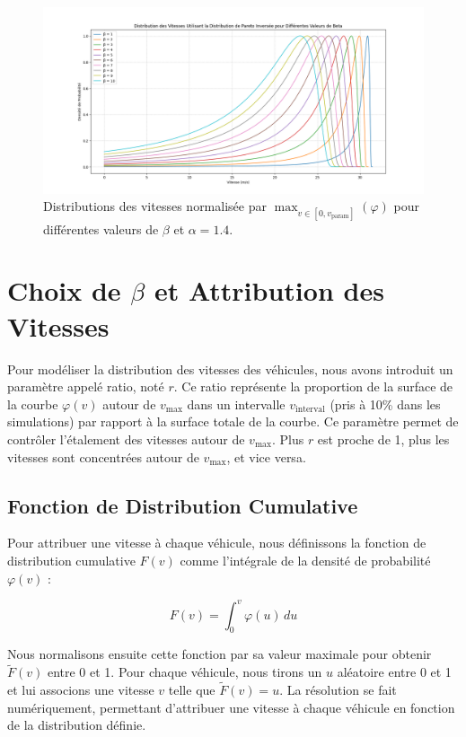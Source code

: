 \documentclass{article}
\begin{document}
\begin{figure}[h!]
    \centering
    \includegraphics[width=\linewidth]{Free Speed Distribution.png}
    \caption{Distributions des vitesses normalisée par \( \displaystyle \max_{v \in [0, v_{\text{param}}]}(\varphi) \) pour différentes valeurs de \(\beta\) et \( \alpha = 1.4 \).}
    \label{fig:pareto_distributions}
\end{figure}



\section{Choix de \(\beta\) et Attribution des Vitesses}

Pour modéliser la distribution des vitesses des véhicules, nous avons introduit un paramètre appelé ratio, noté \(r\). Ce ratio représente la proportion de la surface de la courbe \(\varphi(v)\) autour de \(v_{\text{max}}\) dans un intervalle \(v_{\text{interval}}\) (pris à 10\% dans les simulations) par rapport à la surface totale de la courbe. Ce paramètre permet de contrôler l'étalement des vitesses autour de \(v_{\text{max}}\). Plus \(r\) est proche de 1, plus les vitesses sont concentrées autour de \(v_{\text{max}}\), et vice versa.

\subsection{Fonction de Distribution Cumulative}

Pour attribuer une vitesse à chaque véhicule, nous définissons la fonction de distribution cumulative \(F(v)\) comme l'intégrale de la densité de probabilité \(\varphi(v)\) :

\[
F(v) = \int_0^v \varphi(u) \, du
\]

Nous normalisons ensuite cette fonction par sa valeur maximale pour obtenir \(\tilde{F}(v)\) entre 0 et 1. Pour chaque véhicule, nous tirons un \(u\) aléatoire entre 0 et 1 et lui associons une vitesse \(v\) telle que \(\tilde{F}(v) = u\). La résolution se fait numériquement, permettant d'attribuer une vitesse à chaque véhicule en fonction de la distribution définie.
\end{document}
